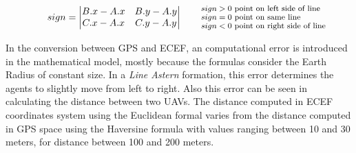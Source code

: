 \begin{equation}
sign = \begin{vmatrix}B.x - A.x & B.y - A.y \\ C.x - A.x & C.y - A.y\end{vmatrix}
\qquad\parbox{4.0cm}{\footnotesize$\begin{aligned} 
  sign > 0  & \text{ point on left side of line}
  \\[-1.0ex] sign = 0  & \text{ point on same line}
  \\[-1.0ex] sign < 0  & \text{ point on right side of line}
  \end{aligned}$}
\label{eqn:side-of-line}
\end{equation}

In the conversion between GPS and ECEF, an computational error is introduced 
in the mathematical model,  mostly because the formulas consider the Earth Radius
of constant size. In a \textit{Line Astern} formation, this error determines
the agents to slightly move from left to right. Also this error can be seen
in calculating the distance between two UAVs. The distance computed in 
ECEF coordinates system using the Euclidean formal varies from the distance 
computed in GPS space using the Haversine formula with values ranging between
10 and 30 meters,  for distance between 100 and 200 meters.